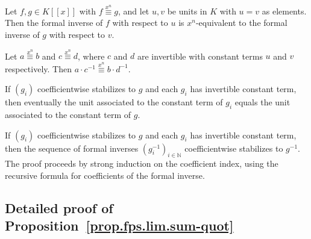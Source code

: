 \begin{lemma}
\label{lem.fps.lim.xnEquiv-invOfUnit-prime}
\leanhelper
\leanok
Let $f, g \in K[[x]]$ with $f \overset{x^n}{\equiv} g$, and let
$u, v$ be units in $K$ with $u = v$ as elements. Then
the formal inverse of $f$ with respect to $u$ is $x^n$-equivalent to
the formal inverse of $g$ with respect to $v$.
\end{lemma}

\begin{lemma}
\label{lem.fps.lim.xnEquiv-div}
\leanhelper
\leanok
Let $a \overset{x^n}{\equiv} b$ and $c \overset{x^n}{\equiv} d$,
where $c$ and $d$ are invertible with constant terms $u$ and $v$
respectively. Then
$a \cdot c^{-1} \overset{x^n}{\equiv}
b \cdot d^{-1}$.
\end{lemma}

\begin{lemma}
\label{lem.fps.lim.unit-eq-of-coeffStabilizesTo}
\leanhelper
\leanok
If $(g_i)$ coefficientwise stabilizes to $g$ and each $g_i$ has
invertible constant term, then eventually the unit associated to the
constant term of $g_i$ equals the unit associated to the constant term
of $g$.
\end{lemma}

\begin{lemma}
\label{lem.fps.lim.coeffStabilizesTo-invOfUnit}
\leanhelper
\leanok
If $(g_i)$ coefficientwise stabilizes to $g$ and each $g_i$ has
invertible constant term, then the sequence of formal inverses
$(g_i^{-1})_{i \in \mathbb{N}}$
coefficientwise stabilizes to $g^{-1}$. The proof
proceeds by strong induction on the coefficient index, using the
recursive formula for coefficients of the formal inverse.
\end{lemma}

\subsection{Detailed proof of Proposition~\ref{prop.fps.lim.sum-quot}}

